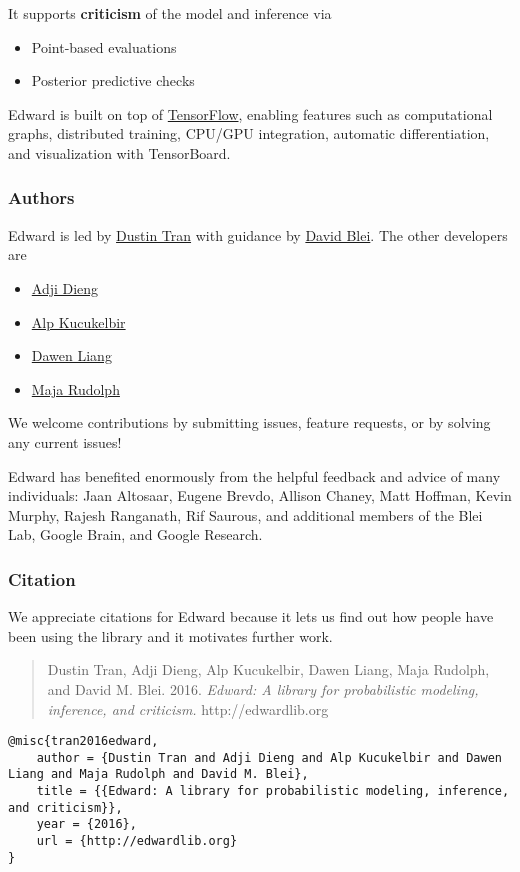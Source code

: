 It supports \textbf{criticism} of the model and inference via
\begin{itemize}
\item Point-based evaluations
\item Posterior predictive checks
\end{itemize}

Edward is built on top of
\href{https://www.tensorflow.org}{TensorFlow}, enabling features such
as computational graphs, distributed training, CPU/GPU integration,
automatic differentiation, and visualization with TensorBoard.

\subsubsection{Authors}

Edward is led by \href{http://dustintran.com}{Dustin Tran} with guidance
by \href{http://www.cs.columbia.edu/~blei/}{David Blei}. The other developers
are
\begin{itemize}
  \item \href{http://stat.columbia.edu/~diengadji/}{Adji Dieng}
  \item \href{http://www.proditus.com/}{Alp Kucukelbir}
  \item \href{http://www.ee.columbia.edu/~dliang/}{Dawen Liang}
  \item \href{http://maja-rita-rudolph.com/}{Maja Rudolph}
\end{itemize}
We welcome contributions by submitting issues, feature requests, or by solving
any current issues!

Edward has benefited enormously from the helpful feedback and advice
of many individuals: Jaan Altosaar, Eugene Brevdo, Allison Chaney, Matt
Hoffman, Kevin Murphy, Rajesh Ranganath, Rif Saurous, and additional
members of the Blei Lab, Google Brain, and Google Research.

\subsubsection{Citation}

We appreciate citations for Edward because it lets us find out how
people have been using the library and it motivates further work.

\begin{quote}
Dustin Tran, Adji Dieng, Alp Kucukelbir, Dawen Liang, Maja Rudolph, and David M.
Blei. 2016.
\emph{Edward: A library for probabilistic modeling, inference, and criticism. }
http://edwardlib.org
\end{quote}

\begin{lstlisting}[class=JSON]
@misc{tran2016edward,
    author = {Dustin Tran and Adji Dieng and Alp Kucukelbir and Dawen Liang and Maja Rudolph and David M. Blei},
    title = {{Edward: A library for probabilistic modeling, inference, and criticism}},
    year = {2016},
    url = {http://edwardlib.org}
}
\end{lstlisting}

